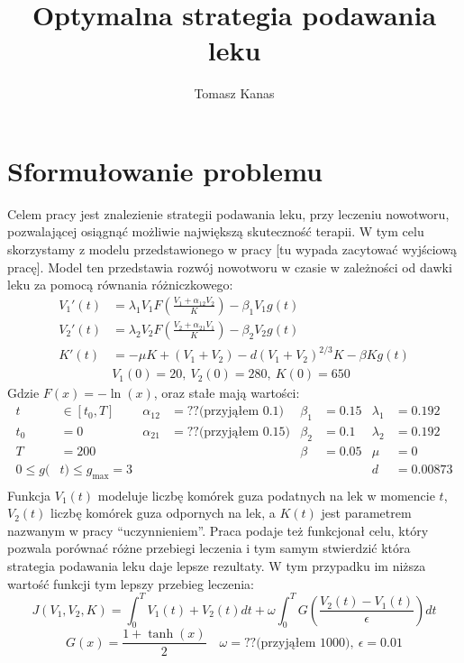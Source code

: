 \documentclass[11pt]{article}
\title{Optymalna strategia podawania leku}
\author{Tomasz Kanas}
\begin{document}
\maketitle

\section{Sformułowanie problemu}

Celem pracy jest znalezienie strategii podawania leku, przy leczeniu nowotworu, pozwalającej osiągnąć możliwie największą skuteczność terapii. W tym celu skorzystamy z modelu przedstawionego w pracy [tu wypada zacytować wyjściową pracę]. Model ten przedstawia rozwój nowotworu w czasie w zależności od dawki leku za pomocą równania różniczkowego:
\begin{equation} \label{ode}
  \begin{aligned} 
    V_1'(t) &= \lambda_1V_1F\left(\frac{V_1 + \alpha_{12}V_2}{K}\right) - \beta_1V_1g(t) \\
    V_2'(t) &= \lambda_2V_2F\left(\frac{V_2 + \alpha_{21}V_1}{K}\right) - \beta_2V_2g(t) \\
    K'(t) &= -\mu K + (V_1+V_2) - d{(V_1 + V_2)}^{2/3}K - \beta K g(t) \\[3pt]
   &V_1(0) = 20,\ V_2(0) = 280,\ K(0) = 650
  \end{aligned}
\end{equation}
Gdzie $F(x) = -\ln(x)$, oraz stałe mają wartości:
\begin{align*}
  t &\in [t_0, T]   & \alpha_{12} &= ?? \text{(przyjąłem 0.1)}  & \beta_1 &= 0.15 & \lambda_1 &= 0.192\\
  t_0 &= 0          & \alpha_{21} &= ?? \text{(przyjąłem 0.15)} & \beta_2 &= 0.1  & \lambda_2 &= 0.192\\
  T &= 200          &&                                           & \beta &= 0.05  & \mu &= 0 \\
  0 \le g(&t) \le g_{\max} = 3 && &&                                              & d &= 0.00873 \\
\end{align*}
Funkcja $V_1(t)$ modeluje liczbę komórek guza podatnych na lek w momencie $t$, $V_2(t)$ liczbę komórek guza odpornych na lek, a $K(t)$ jest parametrem nazwanym w pracy ``uczynnieniem''. Praca podaje też funkcjonał celu, który pozwala porównać różne przebiegi leczenia i tym samym stwierdzić która strategia podawania leku daje lepsze rezultaty. W tym przypadku im niższa wartość funkcji tym lepszy przebieg leczenia:
\begin{equation} \label{objf}
  J(V_1, V_2, K) = \int_0^T V_1(t) + V_2(t)dt + \omega\int_0^T G\left(\frac{V_2(t) - V_1(t)}{\epsilon}\right) dt
\end{equation}
\begin{equation*}
  G(x) = \frac{1+\tanh(x)}{2} \quad
  \omega = ?? \text{(przyjąłem 1000)},\ \epsilon = 0.01
\end{equation*}
\end{document}
